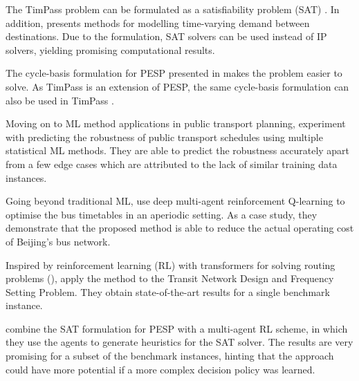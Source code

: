 \documentclass[english, 12pt, a4paper, sci, utf8, a-2b, online]{aaltothesis}
\begin{document}


The TimPass problem can be formulated as a satisfiability problem (SAT) \cite{sat-philine-gattermann2016integrating}. In addition, \cite{sat-philine-gattermann2016integrating} presents methods for modelling time-varying demand between destinations. Due to the formulation, SAT solvers can be used instead of IP solvers, yielding promising computational results.

The cycle-basis formulation for PESP presented in \cite{cycle-basis-original-2001} makes the problem easier to solve. As TimPass is an extension of PESP, the same cycle-basis formulation can also be used in TimPass \cite{schiewe2020periodic}.



Moving on to ML method applications in public transport planning, \cite{MULLERHANNEMANN2022103566} experiment with predicting the robustness of public transport schedules using multiple statistical ML methods. They are able to predict the robustness accurately apart from a few edge cases which are attributed to the lack of similar training data instances.

Going beyond traditional ML, \cite{DRL-timetabling-yan2022distributed} use deep multi-agent reinforcement Q-learning to optimise the bus timetables in an aperiodic setting. As a case study, they demonstrate that the proposed method is able to reduce the actual operating cost of Beijing's bus network.

Inspired by reinforcement learning (RL) with transformers for solving routing problems (\cite{kool2018attention}), \cite{darwish2020optimising} apply the method to the Transit Network Design and Frequency Setting Problem. They obtain state-of-the-art results for a single benchmark instance.

\cite{matos2021solving} combine the SAT formulation for PESP with a multi-agent RL scheme, in which they use the agents to generate heuristics for the SAT solver. The results are very promising for a subset of the benchmark instances, hinting that the approach could have more potential if a more complex decision policy was learned.
\end{document}
